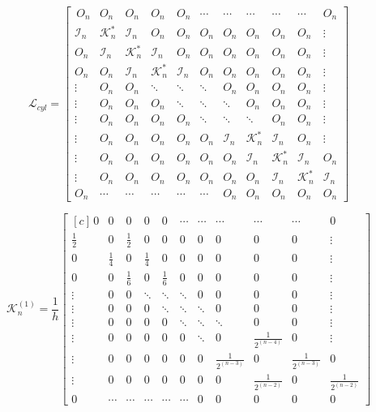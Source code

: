 \[ 
\mathcal{L}_{cyl} = 
\begin{bmatrix} \,
O_{n} & O_{n} & O_{n} & O_{n} & O_{n} & \cdots & \cdots & \cdots & \cdots & \cdots & O_{n}\\
\mathcal{I}_{n} & \mathcal{K}_{n}^{*} & \mathcal{I}_{n} & O_{n} & O_{n} & O_{n} & O_{n} & O_{n} & O_{n} & O_{n} & \vdots\\
O_{n} & \mathcal{I}_{n} & \mathcal{K}_{n}^{*} & \mathcal{I}_{n} & O_{n} & O_{n} & O_{n} & O_{n} & O_{n} & O_{n} & \vdots\\
O_{n} & O_{n}  & \mathcal{I}_{n} & \mathcal{K}_{n}^{*} & \mathcal{I}_{n} & O_{n} & O_{n} & O_{n} & O_{n} & O_{n} & \vdots\\
\vdots & O_{n}  & O_{n}  & \ddots & \ddots & \ddots & O_{n} & O_{n} & O_{n} & O_{n}  & \vdots \\
\vdots & O_{n}  & O_{n}  & O_{n}  & \ddots & \ddots & \ddots & O_{n} & O_{n} & O_{n} & \vdots \\
\vdots & O_{n}  & O_{n}  & O_{n} & O_{n} & \ddots & \ddots & \ddots & O_{n} & O_{n}  & \vdots \\
\vdots & O_{n}  & O_{n}  & O_{n} & O_{n} & O_{n} & \mathcal{I}_{n} & \mathcal{K}_{n}^{*} & \mathcal{I}_{n} & O_{n}  & \vdots\\
\vdots & O_{n}  & O_{n}  & O_{n} & O_{n} & O_{n} & O_{n} & \mathcal{I}_{n} & \mathcal{K}_{n}^{*}  & \mathcal{I}_{n} & O_{n}\\
\vdots & O_{n} & O_{n} & O_{n} & O_{n} & O_{n} & O_{n} & O_{n} & \mathcal{I}_{n} & \mathcal{K}_{n}^{*} & \mathcal{I}_{n}\\
O_{n}      & \cdots & \cdots & \cdots & \cdots & \cdots & O_{n} & O_{n} & O_{n} & O_{n} & {O}_{n}
\end{bmatrix} 
\]

\[
    \mathcal{K}_n^{(1)} = 
\frac{1}{h}
\begin{bmatrix*}[c] \,
0 & 0 & 0 & 0& 0 & \cdots & \cdots & \cdots & \cdots & \cdots & 0 \\
\frac{1}{2} & 0 & \frac{1}{2} & 0 & 0 & 0 & 0 & 0 & 0 & 0 & \vdots \\
0 & \frac{1}{4} & 0 & \frac{1}{4} & 0 & 0 & 0 & 0 & 0 & 0 & \vdots \\
0 & 0 & \frac{1}{6} & 0 & \frac{1}{6} & 0 & 0 & 0 & 0 & 0 & \vdots \\
\vdots & 0  & 0  & \ddots & \ddots & \ddots & 0 & 0 & 0 & 0  & \vdots \\
\vdots & 0  & 0  & 0  & \ddots & \ddots & \ddots & 0 & 0 & 0 & \vdots \\
\vdots & 0  & 0  & 0 & 0 & \ddots & \ddots & \ddots & 0 & 0  & \vdots \\
\vdots & 0  & 0  & 0 & 0 & 0 & \ddots & 0 & \frac{1}{2^{(n-4)}} & 0  & \vdots\\
\vdots & 0  & 0  & 0 & 0 & 0 & 0 & \frac{1}{2^{(n-3)}} & 0  & \frac{1}{2^{(n-3)}} & 0\\
\vdots & 0 & 0 & 0 & 0 & 0 & 0 & 0 & \frac{1}{2^{(n-2)}} & 0 & \frac{1}{2^{(n-2)}}\\
0      & \cdots & \cdots & \cdots & \cdots & \cdots & 0 & 0 & 0 & 0 & 0 
\end{bmatrix*}
\]

